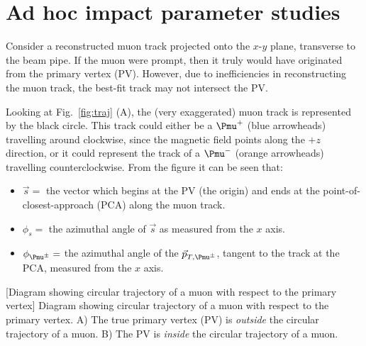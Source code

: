 

\chapter{Ad hoc impact parameter studies}
\label{app:adhoc_studies}


Consider a reconstructed muon track projected onto the $x$-$y$ plane, transverse to the beam pipe.
If the muon were prompt, then it truly would have originated from the primary vertex (PV).
However, due to inefficiencies in reconstructing the muon track, 
the best-fit track may not intersect the PV. 

Looking at Fig.~\ref{fig:traj} (A), the (very exaggerated) muon track is represented by the black circle.
This track could either be a $\Pmu^+$ (blue arrowheads) travelling around clockwise, since the magnetic field points along the $+z$ direction,
or it could represent the track of a $\Pmu^-$ (orange arrowheads) travelling counterclockwise.
From the figure it can be seen that:
\begin{itemize}
    \item $\vec{s} =$ the vector which begins at the PV (the origin) and ends at the point-of-closest-approach (PCA) along the muon track.
    \item $\phi_s =$ the azimuthal angle of ${\vec{s}}$ as measured from the $x$ axis.
    \item $\phi_{\Pmu^{\pm}} =$ the azimuthal angle of the $\vec{p}_{T,\Pmu^{\pm}}$, tangent to the track at the PCA, measured from the $x$ axis.
\end{itemize}
\begin{multiFigure}
    \centering
        [Diagram showing circular trajectory of a muon with respect to the primary vertex]
        {Diagram showing circular trajectory of a muon with respect to the primary vertex.
        \;A) The true primary vertex (PV) is \emph{outside} the circular trajectory of a muon.
        \;B) The PV is \emph{inside} the circular trajectory of a muon.} 
    \label{fig:traj}
\end{multiFigure}

